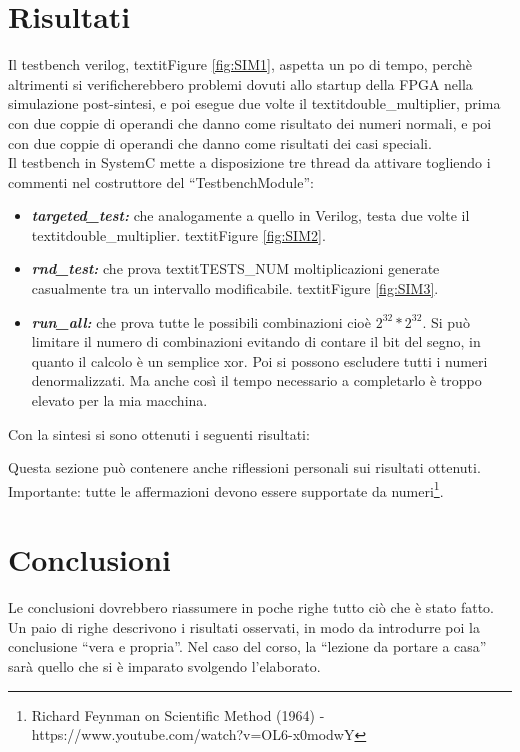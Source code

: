 \documentclass[]{IEEEtran}
\begin{document}
\section{Risultati}
Il testbench verilog, textit{Figure \ref{fig:SIM1}}, aspetta un po di tempo, perchè altrimenti si verificherebbero problemi dovuti allo startup della FPGA nella simulazione post-sintesi, e poi esegue due volte il textit{double\_multiplier}, prima con due coppie di operandi che danno come risultato dei numeri normali, e poi con due coppie di operandi che danno come risultati dei casi speciali. \\

Il testbench in SystemC mette a disposizione tre thread da attivare togliendo i commenti nel costruttore del ``TestbenchModule'':
\begin{itemize}
    \item {\it\bf targeted\_test:} che analogamente a quello in Verilog, testa due volte il textit{double\_multiplier}. textit{Figure \ref{fig:SIM2}}.
    \item {\it\bf rnd\_test:} che prova textit{TESTS\_NUM} moltiplicazioni generate casualmente tra un intervallo modificabile. textit{Figure \ref{fig:SIM3}}.
    \item {\it\bf run\_all:} che prova tutte le possibili combinazioni cioè \(2^{32} * 2^{32}\). Si può limitare il numero di combinazioni evitando di contare il bit del segno, in quanto il calcolo è un semplice xor. Poi si possono escludere tutti i numeri denormalizzati. Ma anche così il tempo necessario a completarlo è troppo elevato per la mia macchina.
\end{itemize}
Con la sintesi si sono ottenuti i seguenti risultati:


















Questa sezione può contenere anche riflessioni personali sui risultati ottenuti. Importante: tutte le affermazioni devono essere supportate da numeri\footnote{Richard Feynman on Scientific Method (1964) -\\ https://www.youtube.com/watch?v=OL6-x0modwY}.

\section{Conclusioni}
Le conclusioni dovrebbero riassumere in poche righe  tutto ciò che è stato fatto. Un paio di righe descrivono i risultati osservati, in modo da introdurre poi la conclusione ``vera e propria''. Nel caso del corso, la ``lezione da portare a casa'' sarà quello che si è imparato svolgendo l'elaborato.
\end{document}
